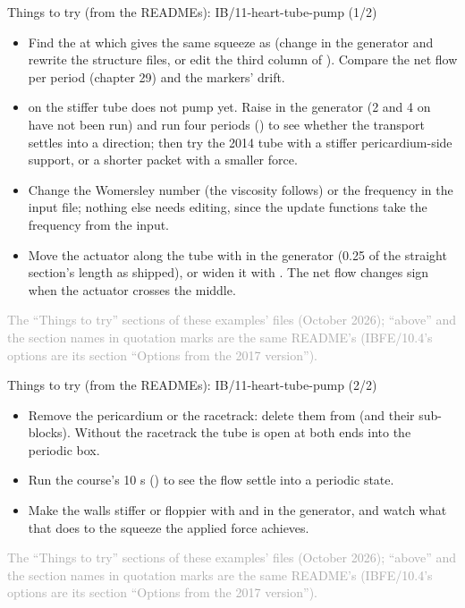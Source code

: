 \documentclass[aspectratio=169,11pt]{beamer}
\newcommand{\sourcecredit}[1]{\vfill\begin{flushright}\tiny\textcolor{DarkGray}{#1}\end{flushright}}
\begin{document}
\begin{frame}{Things to try (from the READMEs): IB/11-heart-tube-pump (1/2)}
\scriptsize\setlength{\leftmargini}{5em}
\begin{itemize}\setlength{\itemsep}{1pt}
  \item[IB/11.1] Find the  at which  gives the same squeeze as  (change  in the generator and rewrite the structure files, or edit the third column of ). Compare the net flow per period (chapter 29) and the markers' drift.
  \item[IB/11.2]  on the stiffer tube does not pump yet. Raise  in the generator (2 and 4 on  have not been run) and run four periods () to see whether the transport settles into a direction; then try the 2014 tube with a stiffer pericardium-side support, or a shorter packet with a smaller force.
  \item[IB/11.3] Change the Womersley number  (the viscosity follows) or the frequency  in the input file; nothing else needs editing, since the update functions take the frequency from the input.
  \item[IB/11.4] Move the actuator along the tube with  in the generator (0.25 of the straight section's length as shipped), or widen it with . The net flow changes sign when the actuator crosses the middle.
\end{itemize}
\sourcecredit{The ``Things to try'' sections of these examples' \code{README.md} files (October 2026); ``above'' and the section names in quotation marks are the same README's (IBFE/10.4's options are its section ``Options from the 2017 version'').}
\end{frame}

\begin{frame}{Things to try (from the READMEs): IB/11-heart-tube-pump (2/2)}
\scriptsize\setlength{\leftmargini}{5em}
\begin{itemize}\setlength{\itemsep}{1pt}
  \item[IB/11.5] Remove the pericardium or the racetrack: delete them from  (and their sub-blocks). Without the racetrack the tube is open at both ends into the periodic box.
  \item[IB/11.6] Run the course's 10 s () to see the flow settle into a periodic state.
  \item[IB/11.7] Make the walls stiffer or floppier with  and  in the generator, and watch what that does to the squeeze the applied force achieves.
\end{itemize}
\sourcecredit{The ``Things to try'' sections of these examples' \code{README.md} files (October 2026); ``above'' and the section names in quotation marks are the same README's (IBFE/10.4's options are its section ``Options from the 2017 version'').}
\end{frame}
\end{document}

